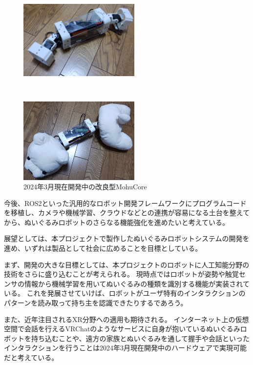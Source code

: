 \documentclass[uplatex,a4paper,12pt]{jsarticle}
\begin{document}
\begin{figure}[htbp]
  \centering
  \begin{minipage}[c]{0.48\linewidth}
    \centering
    \includegraphics[keepaspectratio,width=6cm,clip]{images/prototype/prototype_04_01.jpg}
  \end{minipage} \\
  \begin{minipage}[c]{0.48\linewidth}
    \centering
    \includegraphics[keepaspectratio,width=6cm,clip]{images/prototype/prototype_04_02.jpg}
  \end{minipage}
  \caption{2024年3月現在開発中の改良型MohuCore}
  \label{fig:prototype_04}
\end{figure}

今後、ROS2といった汎用的なロボット開発フレームワークにプログラムコードを移植し、カメラや機械学習、クラウドなどとの連携が容易になる土台を整えてから、ぬいぐるみロボットのさらなる機能強化を進めたいと考えている。

展望としては、本プロジェクトで製作したぬいぐるみロボットシステムの開発を進め、いずれは製品として社会に広めることを目標としている。

まず、開発の大きな目標としては、本プロジェクトのロボットに人工知能分野の技術をさらに盛り込むことが考えられる。
現時点ではロボットが姿勢や触覚センサの情報から機械学習を用いてぬいぐるみの種類を識別する機能が実装されている。
これを発展させていけば、ロボットがユーザ特有のインタラクションのパターンを読み取って持ち主を認識できたりするであろう。

また、近年注目されるXR分野への適用も期待される。
インターネット上の仮想空間で会話を行えるVRChatのようなサービスに自身が抱いているぬいぐるみロボットを持ち込むことや、遠方の家族とぬいぐるみを通して握手や会話といったインタラクションを行うことは2024年3月現在開発中のハードウェアで実現可能だと考えている。
\end{document}

